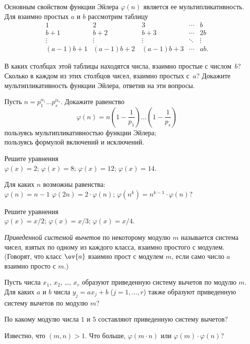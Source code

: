 \begin{problems}

\item
Основным свойством функции Эйлера $\varphi(n)$ является ее
мультипликативность.
Для взаимно простых $a$ и $b$ рассмотрим таблицу
\[ \begin{array}{ccccc}
    1 & 2 & 3 & \cdots & b
\\
    b + 1 & b + 2 & b + 3 & \cdots & 2 b
\\
    \vdots
    &
    \vdots
    &
    \vdots
    &
    \ddots
    &
    \vdots
\\
    (a - 1) b + 1 & (a - 1) b + 2 \ & (a - 1) b + 3 & \cdots & ab.
\end{array} \]

В каких столбцах этой таблицы находятся числа, взаимно простые с числом~$b$?
Сколько в каждом из этих столбцов чисел, взаимно простых с~$a$?
Докажите мультипликативность функции Эйлера, ответив на эти вопросы.

\item
Пусть $n = p_1^{\alpha_1} \ldots p_s^{\alpha_s}$.
Докажите равенство
\[
    \varphi(n)
=
    n \left(
        1 - \frac{1}{p_1}
    \right)
    \ldots
    \left(
        1 - \frac{1}{p_s}
    \right)
\]
\sbp пользуясь мультипликативностью функции Эйлера;
\\
\sbp пользуясь формулой включений и исключений.

\item
Решите уравнения
\\
\sbp $\varphi(x) = 2$;
\qquad
\sbp $\varphi(x) = 8$;
\qquad
\sbp $\varphi(x) = 12$;
\qquad
\sbp $\varphi(x) = 14$.

\item
Для каких $n$ возможны равенства:
\\
\sbp $\varphi(n) = n - 1$
\qquad
\sbp $\varphi(2 n) = 2 \cdot \varphi(n)$;
\qquad
\sbp $\varphi(n^k) = n^{k-1} \cdot \varphi(n)$?
 
\item
Решите уравнения
\\
\sbp $\varphi(x) = x / 2$;
\qquad
\sbp $\varphi(x) = x / 3$;
\qquad
\sbp $\varphi(x) = x / 4$.

\emph{Приведенной системой вычетов} по некоторому модулю $m$ называется система
чисел, взятых по одному из каждого класса, взаимно простого с модулем.
(Говорят, что класс $\ov{a}$ взаимно прост с модулем $m$, если само число $a$
взаимно просто с $m$.)

\item
Пусть числа $x_1$, $x_2$, \ldots, $x_r$ образуют приведенную систему вычетов по
модулю $m$.
Для каких $a$ и $b$ числа $y_j = a x_j + b$ ($j = 1, \ldots, r$) также образуют
приведенную систему вычетов по модулю $m$?

\item
По какому модулю числа $1$ и $5$ составляют приведенную систему вычетов?

\item
Известно, что $(m, n) > 1$.
Что больше, $\varphi(m \cdot n)$ или $\varphi(m) \cdot \varphi(n)$?

\end{problems}

